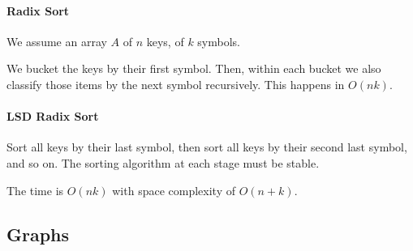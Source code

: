 \paragraph{Radix Sort}
We assume an array \(A\) of \(n\) keys, of \(k\) symbols.

We bucket the keys by their first symbol. Then, within each bucket we  also classify those items by the next symbol recursively.
This happens in \(O(nk)\).

\paragraph{LSD Radix Sort}
Sort all keys by their last symbol, then sort all keys by their second last symbol, and so on.
The sorting algorithm at each stage must be stable.


The time is \(O(nk)\) with space complexity of \(O(n + k)\).

\subsection{Graphs}  




